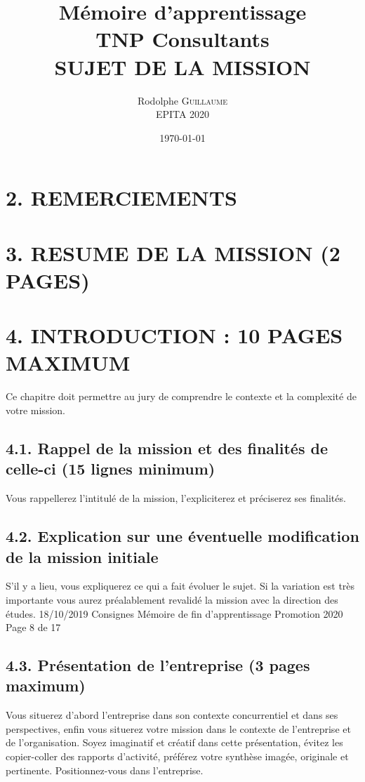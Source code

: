 \documentclass[a4paper, 12pt]{article}
\title{
Mémoire d'apprentissage\\
TNP Consultants\\
SUJET DE LA MISSION
}
\author{
Rodolphe \textsc{Guillaume} \\
EPITA 2020
}
\date{\today}
\begin{document}
\maketitle
\thispagestyle{empty}
\newpage{}

\tableofcontents

\thispagestyle{empty}

\newpage{}
\setcounter{page}{1}
\section{2. REMERCIEMENTS}

\newpage{}
\section{3. RESUME DE LA MISSION (2 PAGES)}

\newpage{}
\section{4. INTRODUCTION : 10 PAGES MAXIMUM}

Ce chapitre doit permettre au jury de comprendre le contexte et la complexité de votre
mission.

\subsection{4.1. Rappel de la mission et des finalités de celle-ci (15 lignes minimum)}

Vous rappellerez l’intitulé de la mission, l’expliciterez et préciserez ses finalités.

\subsection{4.2. Explication sur une éventuelle modification de la mission initiale}

S’il y a lieu, vous expliquerez ce qui a fait évoluer le sujet. Si la variation est très importante
vous aurez préalablement revalidé la mission avec la direction des études.
18/10/2019 Consignes Mémoire de fin d'apprentissage Promotion 2020 Page 8 de 17

\subsection{4.3. Présentation de l'entreprise (3 pages maximum)}

Vous situerez d’abord l’entreprise dans son contexte concurrentiel et dans ses perspectives, enfin vous
situerez votre mission dans le contexte de l’entreprise et de l’organisation. Soyez imaginatif et créatif
dans cette présentation, évitez les copier-coller des rapports d’activité, préférez votre synthèse imagée,
originale et pertinente. Positionnez-vous dans l’entreprise.
\end{document}
